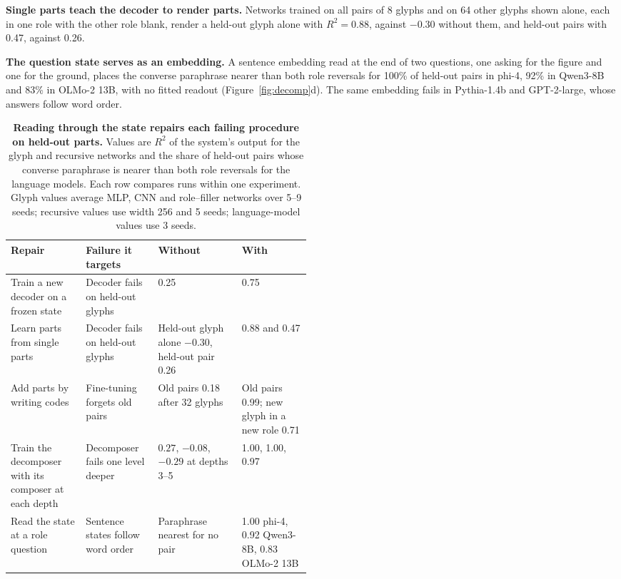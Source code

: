 \textbf{Single parts teach the decoder to render parts.} Networks trained on all pairs of 8 glyphs and on 64 other glyphs shown alone, each in one role with the other role blank, render a held-out glyph alone with $R^2 = 0.88$, against $-0.30$ without them, and held-out pairs with 0.47, against 0.26.

\textbf{The question state serves as an embedding.} A sentence embedding read at the end of two questions, one asking for the figure and one for the ground, places the converse paraphrase nearer than both role reversals for 100\% of held-out pairs in phi-4, 92\% in Qwen3-8B and 83\% in OLMo-2 13B, with no fitted readout (Figure~\ref{fig:decomp}d). The same embedding fails in Pythia-1.4b and GPT-2-large, whose answers follow word order.

\begin{table}[t]
  \caption{\textbf{Reading through the state repairs each failing procedure on held-out parts.} Values are $R^2$ of the system's output for the glyph and recursive networks and the share of held-out pairs whose converse paraphrase is nearer than both role reversals for the language models. Each row compares runs within one experiment. Glyph values average MLP, CNN and role--filler networks over 5--9 seeds; recursive values use width 256 and 5 seeds; language-model values use 3 seeds.}
  \label{tab:remedies}
  \centering\small
  \begin{tabularx}{\linewidth}{@{}P{0.25\linewidth}P{0.24\linewidth}YY@{}}
    \toprule
    Repair & Failure it targets & Without & With \\
    \midrule
    Train a new decoder on a frozen state & Decoder fails on held-out glyphs & 0.25 & 0.75 \\
    Learn parts from single parts & Decoder fails on held-out glyphs & Held-out glyph alone $-0.30$, held-out pair 0.26 & 0.88 and 0.47 \\
    Add parts by writing codes & Fine-tuning forgets old pairs & Old pairs 0.18 after 32 glyphs & Old pairs 0.99; new glyph in a new role 0.71 \\
    Train the decomposer with its composer at each depth & Decomposer fails one level deeper & $0.27$, $-0.08$, $-0.29$ at depths 3--5 & 1.00, 1.00, 0.97 \\
    Read the state at a role question & Sentence states follow word order & Paraphrase nearest for no pair & 1.00 phi-4, 0.92 Qwen3-8B, 0.83 OLMo-2 13B \\
    \bottomrule
  \end{tabularx}
\end{table}

